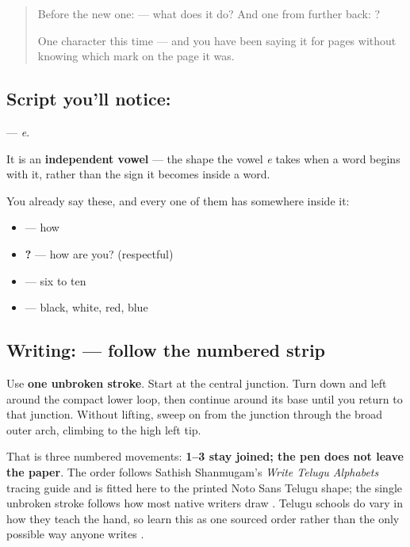 \begin{quote}
Before the new one:  — what does it do? And one from further back: ?

One character this time — and you have been saying it for pages without knowing which mark on the page it was.
\end{quote}

\subsection*{Script you'll notice: }
\textbf{} — \emph{e}.

It is an \textbf{independent vowel} — the shape the vowel \emph{e} takes when a word begins with it, rather than the sign it becomes inside a word.

You already say these, and every one of them has  somewhere inside it:

\begin{itemize}
\raggedright
  \item \textbf{} — how
  \item \textbf{  ?} — how are you? (respectful)
  \item \textbf{    } — six to ten
  \item \textbf{   } — black, white, red, blue
\end{itemize}

\subsection*{Writing:  — follow the numbered strip}

Use \textbf{one unbroken stroke}. Start at the central junction. Turn down and left around the compact lower loop, then continue around its base until you return to that junction. Without lifting, sweep on from the junction through the broad outer arch, climbing to the high left tip.

That is three numbered movements: \textbf{1–3 stay joined; the pen does not leave the paper}. The order follows Sathish Shanmugam's \emph{Write Telugu Alphabets} tracing guide and is fitted here to the printed Noto Sans Telugu shape; the single unbroken stroke follows how most native writers draw . Telugu schools do vary in how they teach the hand, so learn this as one sourced order rather than the only possible way anyone writes .

